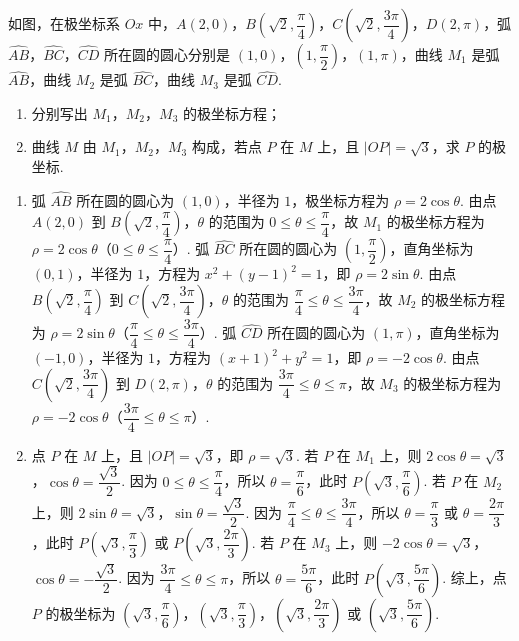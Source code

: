 \begin{problem}
如图，在极坐标系 \(Ox\) 中，\(A(2,0)\)，\(B(\sqrt2,\dfrac{\pi}{4})\)，\(C(\sqrt2,\dfrac{3\pi}{4})\)，\(D(2,\pi)\)，弧 \(\widehat{AB}\)，\(\widehat{BC}\)，\(\widehat{CD}\) 所在圆的圆心分别是 \((1,0)\)，\((1,\dfrac{\pi}{2})\)，\((1,\pi)\)，曲线 \(M_1\) 是弧 \(\widehat{AB}\)，曲线 \(M_2\) 是弧 \(\widehat{BC}\)，曲线 \(M_3\) 是弧 \(\widehat{CD}\).

\begin{enumerate}
\item 分别写出 \(M_1\)，\(M_2\)，\(M_3\) 的极坐标方程；
\item 曲线 \(M\) 由 \(M_1\)，\(M_2\)，\(M_3\) 构成，若点 \(P\) 在 \(M\) 上，且 \(|OP|=\sqrt3\)，求 \(P\) 的极坐标.
\end{enumerate}

\end{problem}

\begin{solution}
\begin{enumerate}
\item 弧 \(\widehat{AB}\) 所在圆的圆心为 \((1,0)\)，半径为 \(1\)，极坐标方程为 \(\rho=2\cos\theta\). 由点 \(A(2,0)\) 到 \(B\left(\sqrt2,\dfrac\pi4\right)\)，\(\theta\) 的范围为 \(0\le\theta\le\dfrac\pi4\)，故 \(M_1\) 的极坐标方程为 \(\rho=2\cos\theta\)（\(0\le\theta\le\dfrac\pi4\)）.
弧 \(\widehat{BC}\) 所在圆的圆心为 \(\left(1,\dfrac\pi2\right)\)，直角坐标为 \((0,1)\)，半径为 \(1\)，方程为 \(x^2+(y-1)^2=1\)，即 \(\rho=2\sin\theta\). 由点 \(B\left(\sqrt2,\dfrac\pi4\right)\) 到 \(C\left(\sqrt2,\dfrac{3\pi}{4}\right)\)，\(\theta\) 的范围为 \(\dfrac\pi4\le\theta\le\dfrac{3\pi}{4}\)，故 \(M_2\) 的极坐标方程为 \(\rho=2\sin\theta\)（\(\dfrac\pi4\le\theta\le\dfrac{3\pi}{4}\)）.
弧 \(\widehat{CD}\) 所在圆的圆心为 \((1,\pi)\)，直角坐标为 \((-1,0)\)，半径为 \(1\)，方程为 \((x+1)^2+y^2=1\)，即 \(\rho=-2\cos\theta\). 由点 \(C\left(\sqrt2,\dfrac{3\pi}{4}\right)\) 到 \(D(2,\pi)\)，\(\theta\) 的范围为 \(\dfrac{3\pi}{4}\le\theta\le\pi\)，故 \(M_3\) 的极坐标方程为 \(\rho=-2\cos\theta\)（\(\dfrac{3\pi}{4}\le\theta\le\pi\)）.

\item 点 \(P\) 在 \(M\) 上，且 \(|OP|=\sqrt3\)，即 \(\rho=\sqrt3\).
若 \(P\) 在 \(M_1\) 上，则 \(2\cos\theta=\sqrt3\)，\(\cos\theta=\dfrac{\sqrt3}{2}\). 因为 \(0\le\theta\le\dfrac\pi4\)，所以 \(\theta=\dfrac\pi6\)，此时 \(P\left(\sqrt3,\dfrac\pi6\right)\).
若 \(P\) 在 \(M_2\) 上，则 \(2\sin\theta=\sqrt3\)，\(\sin\theta=\dfrac{\sqrt3}{2}\). 因为 \(\dfrac\pi4\le\theta\le\dfrac{3\pi}{4}\)，所以 \(\theta=\dfrac\pi3\) 或 \(\theta=\dfrac{2\pi}{3}\)，此时 \(P\left(\sqrt3,\dfrac\pi3\right)\) 或 \(P\left(\sqrt3,\dfrac{2\pi}{3}\right)\).
若 \(P\) 在 \(M_3\) 上，则 \(-2\cos\theta=\sqrt3\)，\(\cos\theta=-\dfrac{\sqrt3}{2}\). 因为 \(\dfrac{3\pi}{4}\le\theta\le\pi\)，所以 \(\theta=\dfrac{5\pi}{6}\)，此时 \(P\left(\sqrt3,\dfrac{5\pi}{6}\right)\).
综上，点 \(P\) 的极坐标为 \(\left(\sqrt3,\dfrac\pi6\right)\)，\(\left(\sqrt3,\dfrac\pi3\right)\)，\(\left(\sqrt3,\dfrac{2\pi}{3}\right)\) 或 \(\left(\sqrt3,\dfrac{5\pi}{6}\right)\).
\end{enumerate}
\end{solution}

